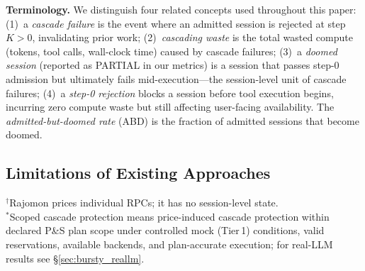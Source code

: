 \documentclass[sigconf,review,anonymous]{acmart}
\begin{document}
\textbf{Terminology.} We distinguish four related concepts used throughout this paper: (1)~a \emph{cascade failure} is the event where an admitted session is rejected at step $K>0$, invalidating prior work; (2)~\emph{cascading waste} is the total wasted compute (tokens, tool calls, wall-clock time) caused by cascade failures; (3)~a \emph{doomed session} (reported as PARTIAL in our metrics) is a session that passes step-0 admission but ultimately fails mid-execution---the session-level unit of cascade failures; (4)~a \emph{step-0 rejection} blocks a session before tool execution begins, incurring zero compute waste but still affecting user-facing availability. The \emph{admitted-but-doomed rate} (ABD) is the fraction of admitted sessions that become doomed.


\subsection{Limitations of Existing Approaches}

\begin{table}[t]
\caption{Comparison of overload control approaches for multi-step workloads. \emph{Session Aware} = tracks cross-request state; \emph{Atomic Admit} = whole-plan admission; \emph{Temporal Isol.} = admitted sessions shielded from price volatility; \emph{Continuation Val.} = progress-dependent effective cost reduction.}
\label{tab:comparison}
\small
{}
\vspace{-0.3em}
{\footnotesize $^\dagger$Rajomon prices individual RPCs; it has no session-level state.\\
$^*$Scoped cascade protection means price-induced cascade protection within declared P\&S plan scope under controlled mock (Tier\,1) conditions, valid reservations, available backends, and plan-accurate execution; for real-LLM results see \S\ref{sec:bursty_reallm}.}
\end{table}
\end{document}
